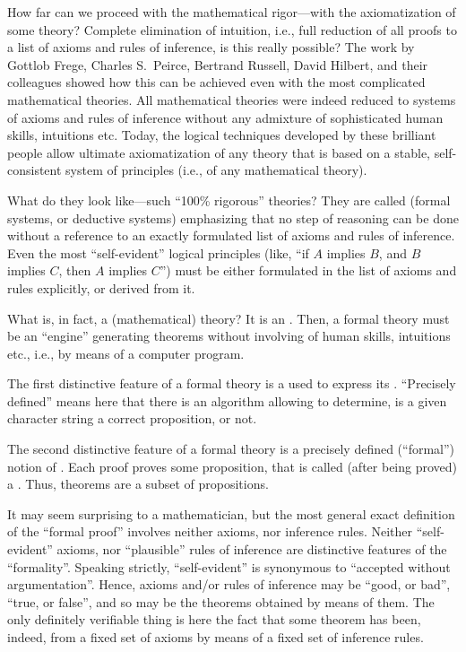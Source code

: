 How far can we proceed with the mathematical rigor---with the axiomatization of some theory?
Complete elimination of intuition, i.e., full reduction of all proofs to a list of axioms and rules of inference, is this really possible?
The work by Gottlob Frege, Charles S.\ Peirce, Bertrand Russell, David Hilbert, and their colleagues showed how this can be achieved even with the most complicated mathematical theories.
All mathematical theories were indeed reduced to systems of axioms and rules of inference without any admixture of sophisticated human skills, intuitions etc.
Today, the logical techniques developed by these brilliant people allow ultimate axiomatization of any theory that is based on a stable, self-consistent system of principles (i.e., of any mathematical theory).

What do they look like---such ``100\% rigorous'' theories?
They are called  (formal systems, or deductive systems) emphasizing that no step of reasoning can be done without a reference to an exactly formulated list of axioms and rules of inference.
Even the most ``self-evident'' logical principles (like, ``if \(A\) implies \(B\), and \(B\) implies \(C\), then \(A\) implies \(C\)'') must be either formulated in the list of axioms and rules explicitly, or derived from it.

What is, in fact, a (mathematical) theory?
It is an .
Then, a formal theory must be an ``engine'' generating theorems without involving of human skills, intuitions etc., i.e., by means of a computer program.

The first distinctive feature of a formal theory is a  used to express its .
``Precisely defined'' means here that there is an algorithm allowing to determine, is a given character string a correct proposition, or not.

The second distinctive feature of a formal theory is a precisely defined (``formal'') notion of .
Each proof proves some proposition, that is called (after being proved) a .
Thus, theorems are a subset of propositions.

It may seem surprising to a mathematician, but the most general exact definition of the ``formal proof'' involves neither axioms, nor inference rules.
Neither ``self-evident'' axioms, nor ``plausible'' rules of inference are distinctive features of the ``formality''.
Speaking strictly, ``self-evident'' is synonymous to ``accepted without argumentation''.
Hence, axioms and/or rules of inference may be ``good, or bad'', ``true, or false'', and so may be the theorems obtained by means of them.
The only definitely verifiable thing is here the fact that some theorem has been, indeed,  from a fixed set of axioms by means of a fixed set of inference rules.

